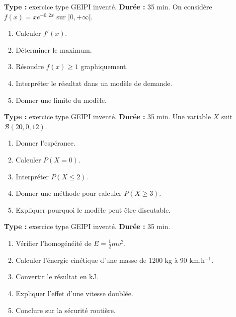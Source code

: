 \documentclass[11pt,a4paper]{article}
\begin{document}
\hypertarget{M-GEIPI-01}{}
\begin{geipi}
\textbf{Type :} exercice type GEIPI inventé.  
\textbf{Durée :} 35 min.  
On considère $f(x)=xe^{-0{,}2x}$ sur $[0,+\infty[$.
\begin{enumerate}
  \item Calculer $f'(x)$.
  \item Déterminer le maximum.
  \item Résoudre $f(x)\geq1$ graphiquement.
  \item Interpréter le résultat dans un modèle de demande.
  \item Donner une limite du modèle.
\end{enumerate}
\end{geipi}

\hypertarget{M-GEIPI-02}{}
\begin{geipi}
\textbf{Type :} exercice type GEIPI inventé.  
\textbf{Durée :} 35 min.  
Une variable $X$ suit $\mathcal{B}(20,0{,}12)$.
\begin{enumerate}
  \item Donner l'espérance.
  \item Calculer $P(X=0)$.
  \item Interpréter $P(X\leq2)$.
  \item Donner une méthode pour calculer $P(X\geq3)$.
  \item Expliquer pourquoi le modèle peut être discutable.
\end{enumerate}
\end{geipi}

\hypertarget{PC-GEIPI-01}{}
\begin{geipi}
\textbf{Type :} exercice type GEIPI inventé.  
\textbf{Durée :} 35 min.
\begin{enumerate}
  \item Vérifier l'homogénéité de $E=\frac12mv^2$.
  \item Calculer l'énergie cinétique d'une masse de 1200 kg à 90 km.h$^{-1}$.
  \item Convertir le résultat en kJ.
  \item Expliquer l'effet d'une vitesse doublée.
  \item Conclure sur la sécurité routière.
\end{enumerate}
\end{geipi}
\end{document}
